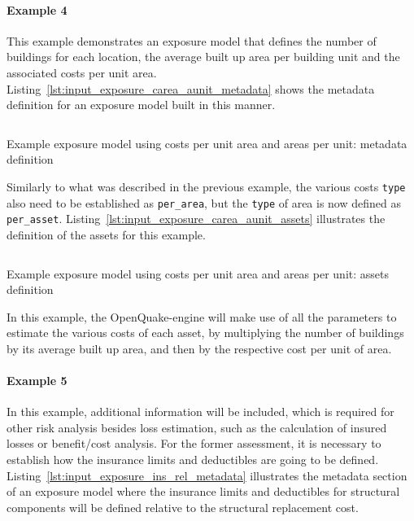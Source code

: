 \paragraph{Example 4}

This example demonstrates an \gls{exposure model} that defines the number of
buildings for each location, the average built up area per building unit and
the associated costs per unit area.
Listing~\ref{lst:input_exposure_carea_aunit_metadata} shows the metadata
definition for an exposure model built in this manner.

\begin{listing}[htbp]
  \inputminted[firstline=8,firstnumber=8,lastline=20,fontsize=\footnotesize,frame=single,linenos,bgcolor=lightgray]{xml}{oqum/risk/Verbatim/input_exposure_carea_aunit.xml}
  \caption{Example exposure model using costs per unit area and areas per unit: metadata definition}
  \label{lst:input_exposure_carea_aunit_metadata}
\end{listing}

Similarly to what was described in the previous example, the various costs
\Verb+type+ also need to be established as \Verb+per_area+, but the
\Verb+type+ of area is now defined as \Verb+per_asset+.
Listing~\ref{lst:input_exposure_carea_aunit_assets} illustrates the definition
of the assets for this example.

\begin{listing}[htbp]
  \inputminted[firstline=21,firstnumber=21,lastline=31,fontsize=\footnotesize,frame=single,linenos,bgcolor=lightgray]{xml}{oqum/risk/Verbatim/input_exposure_carea_aunit.xml}
  \caption{Example exposure model using costs per unit area and areas per unit: assets definition}
  \label{lst:input_exposure_carea_aunit_assets}
\end{listing}

In this example, the OpenQuake-engine will make use of all the parameters to
estimate the various costs of each asset, by multiplying the number of
buildings by its average built up area, and then by the respective cost per
unit of area.


\paragraph{Example 5}

In this example, additional information will be included, which is required
for other risk analysis besides loss estimation, such as the calculation of
insured losses or benefit/cost analysis. For the former assessment, it is
necessary to establish how the insurance limits and deductibles are going to
be defined. Listing~\ref{lst:input_exposure_ins_rel_metadata} illustrates the
metadata section of an exposure model where the insurance limits and
deductibles for structural components will be defined relative to the
structural replacement cost.

